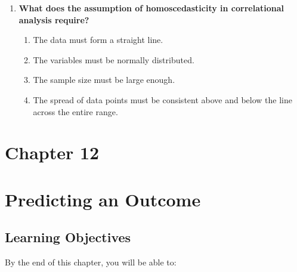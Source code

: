 \documentclass[
  letterpaper,
  DIV=11,
  numbers=noendperiod]{scrreprt}
\begin{document}
\begin{enumerate}
  \begin{enumerate}
  \def\labelenumii{\alph{enumii}.}
  \item
    Pearson's \(r\)
  \item
    Spearman's rho
  \item
    Point-biserial correlation
  \item
    ANOVA
  \end{enumerate}
\item
  \textbf{What does the assumption of homoscedasticity in correlational
  analysis require?}

  \begin{enumerate}
  \def\labelenumii{\alph{enumii}.}
  \item
    The data must form a straight line.
  \item
    The variables must be normally distributed.
  \item
    The sample size must be large enough.
  \item
    The spread of data points must be consistent above and below the
    line across the entire range.
  \end{enumerate}
\end{enumerate}


\chapter{Chapter 12}\label{chapter-12}


\chapter*{Predicting an Outcome}\label{predicting-an-outcome}


\section*{Learning Objectives}\label{learning-objectives-11}


By the end of this chapter, you will be able to:
\end{document}
